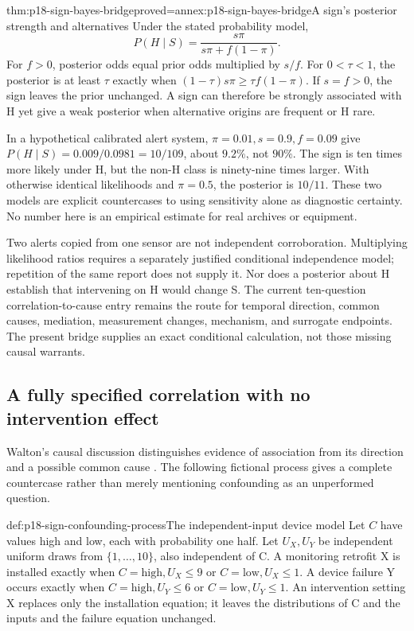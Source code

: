 \begin{hbtheorem}{thm:p18-sign-bayes-bridge}{proved=annex:p18-sign-bayes-bridge}{A sign's posterior strength and alternatives}
Under the stated probability model,
\[
 P(H\mid S)=\frac{s\pi}{s\pi+f(1-\pi)}.
\]
For \(f>0\), posterior odds equal prior odds multiplied by \(s/f\).
For \(0<\tau<1\), the posterior is at least \(\tau\) exactly when
\((1-\tau)s\pi\geq\tau f(1-\pi)\). If \(s=f>0\), the sign leaves
the prior unchanged. A sign can therefore be strongly associated with H
yet give a weak posterior when alternative origins are frequent or H rare.
\end{hbtheorem}

In a hypothetical calibrated alert system, \(\pi=0.01,s=0.9,f=0.09\)
give \(P(H\mid S)=0.009/0.0981=10/109\), about \(9.2\%\), not
\(90\%\). The sign is ten times more likely under H, but the non-H
class is ninety-nine times larger. With otherwise identical likelihoods
and \(\pi=0.5\), the posterior is \(10/11\). These two models are
explicit countercases to using sensitivity alone as diagnostic certainty.
No number here is an empirical estimate for real archives or equipment.

Two alerts copied from one sensor are not independent corroboration.
Multiplying likelihood ratios requires a separately justified conditional
independence model; repetition of the same report does not supply it.
Nor does a posterior about H establish that intervening on H would change
S. The current ten-question correlation-to-cause entry remains the route
for temporal direction, common causes, mediation, measurement changes,
mechanism, and surrogate endpoints. The present bridge supplies an exact
conditional calculation, not those missing causal warrants.

\subsection{A fully specified correlation with no intervention effect}
\label{sec:p18-sign-common-cause-countercase}

Walton's causal discussion distinguishes evidence of association from its
direction and a possible common cause
\parencite[pp.~185--187]{Walton2016ArgumentEvaluation}.
The following fictional process gives a complete countercase rather than
merely mentioning confounding as an unperformed question.

\begin{hbdefinition}{def:p18-sign-confounding-process}{The independent-input device model}
Let \(C\) have values high and low, each with probability one half.
Let \(U_X,U_Y\) be independent uniform draws from \(\{1,\ldots,10\}\),
also independent of C. A monitoring retrofit X is installed exactly when
\(C=\mathrm{high},U_X\leq9\) or \(C=\mathrm{low},U_X\leq1\).
A device failure Y occurs exactly when \(C=\mathrm{high},U_Y\leq6\)
or \(C=\mathrm{low},U_Y\leq1\). An intervention setting X replaces
only the installation equation; it leaves the distributions of C and the
inputs and the failure equation unchanged.
\end{hbdefinition}

